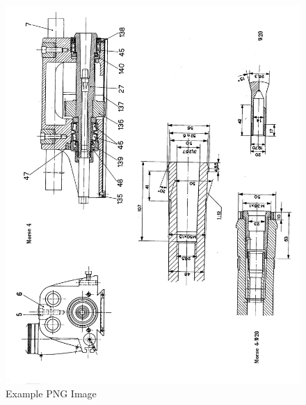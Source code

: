 \newpage
\begin{figure}[h]
    \centering
    \includegraphics[width=1.0\linewidth]{./images/page_22}
    \caption{Example PNG Image}
    \label{fig:horizontal_spindle_dimensions_1}
\end{figure}
